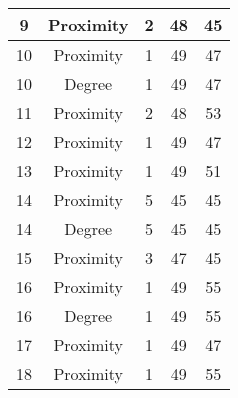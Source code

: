 \documentclass[results.tex]{subfiles}
\begin{document}
\begin{center}
\begin{tabular}{| c || c | c | c | c |}
            \hline
            9                       & Proximity                    & 2                      & 48                      & 45                   \\
            \hline
            10                      & Proximity                    & 1                      & 49                      & 47                   \\
            \hline
            10                      & Degree                       & 1                      & 49                      & 47                   \\
            \hline
            11                      & Proximity                    & 2                      & 48                      & 53                   \\
            \hline
            12                      & Proximity                    & 1                      & 49                      & 47                   \\
            \hline
            13                      & Proximity                    & 1                      & 49                      & 51                   \\
            \hline
            14                      & Proximity                    & 5                      & 45                      & 45                   \\
            \hline
            14                      & Degree                       & 5                      & 45                      & 45                   \\
            \hline
            15                      & Proximity                    & 3                      & 47                      & 45                   \\
            \hline
            16                      & Proximity                    & 1                      & 49                      & 55                   \\
            \hline
            16                      & Degree                       & 1                      & 49                      & 55                   \\
            \hline
            17                      & Proximity                    & 1                      & 49                      & 47                   \\
            \hline
            18                      & Proximity                    & 1                      & 49                      & 55                   \\

\end{tabular}
\end{center}
\end{document}
